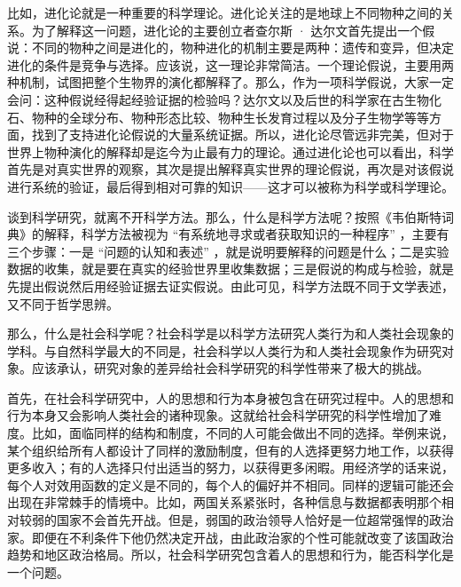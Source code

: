 比如，进化论就是一种重要的科学理论。进化论关注的是地球上不同物种之间的关系。为了解释这一问题，进化论的主要创立者查尔斯 · 达尔文首先提出一个假说：不同的物种之间是进化的，物种进化的机制主要是两种：遗传和变异，但决定进化的条件是竞争与选择。应该说，这一理论非常简洁。一个理论假说，主要用两种机制，试图把整个生物界的演化都解释了。那么，作为一项科学假说，大家一定会问：这种假说经得起经验证据的检验吗？达尔文以及后世的科学家在古生物化石、物种的全球分布、物种形态比较、物种生长发育过程以及分子生物学等等方面，找到了支持进化论假说的大量系统证据。所以，进化论尽管远非完美，但对于世界上物种演化的解释却是迄今为止最有力的理论。通过进化论也可以看出，科学首先是对真实世界的观察，其次是提出解释真实世界的理论假说，再次是对该假说进行系统的验证，最后得到相对可靠的知识——这才可以被称为科学或科学理论。

谈到科学研究，就离不开科学方法。那么，什么是科学方法呢？按照《韦伯斯特词典》的解释，科学方法被视为 “有系统地寻求或者获取知识的一种程序” ，主要有三个步骤：一是 “问题的认知和表述” ，就是说明要解释的问题是什么；二是实验数据的收集，就是要在真实的经验世界里收集数据；三是假说的构成与检验，就是先提出假说然后用经验证据去证实假说。由此可见，科学方法既不同于文学表述，又不同于哲学思辨。


那么，什么是社会科学呢？社会科学是以科学方法研究人类行为和人类社会现象的学科。与自然科学最大的不同是，社会科学以人类行为和人类社会现象作为研究对象。应该承认，研究对象的差异给社会科学研究的科学性带来了极大的挑战。

首先，在社会科学研究中，人的思想和行为本身被包含在研究过程中。人的思想和行为本身又会影响人类社会的诸种现象。这就给社会科学研究的科学性增加了难度。比如，面临同样的结构和制度，不同的人可能会做出不同的选择。举例来说，某个组织给所有人都设计了同样的激励制度，但有的人选择更努力地工作，以获得更多收入；有的人选择只付出适当的努力，以获得更多闲暇。用经济学的话来说，每个人对效用函数的定义是不同的，每个人的偏好并不相同。同样的逻辑可能还会出现在非常棘手的情境中。比如，两国关系紧张时，各种信息与数据都表明那个相对较弱的国家不会首先开战。但是，弱国的政治领导人恰好是一位超常强悍的政治家。即便在不利条件下他仍然决定开战，由此政治家的个性可能就改变了该国政治趋势和地区政治格局。所以，社会科学研究包含着人的思想和行为，能否科学化是一个问题。

